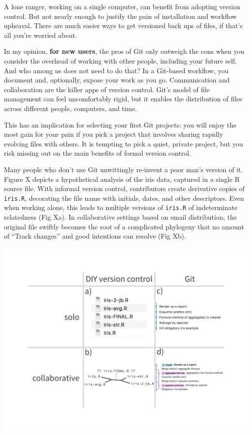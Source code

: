 \documentclass[12pt]{article}
\begin{document}
A lone ranger, working on a single computer, can benefit from adopting
version control. But not nearly enough to justify the pain of
installation and workflow upheaval. There are much easier ways to get
versioned back ups of files, if that's all you're worried about.

In my opinion, \textbf{for new users}, the pros of Git only outweigh the
cons when you consider the overhead of working with other people,
including your future self. And who among us does not need to do that?
In a Git-based workflow, you document and, optionally, expose your work
as you go. Communication and collaboration are the killer apps of
version control. Git's model of file management can feel uncomfortably
rigid, but it enables the distribution of files across different people,
computers, and time.

This has an implication for selecting your first Git projects: you will
enjoy the most gain for your pain if you pick a project that involves
sharing rapidly evolving files with others. It is tempting to pick a
quiet, private project, but you risk missing out on the main benefits of
formal version control.

Many people who don't use Git unwittingly re-invent a poor man's version
of it. Figure X depicts a hypothetical analysis of the iris data,
captured in a single R source file. With informal version control,
contributors create derivative copies of \texttt{iris.R}, decorating the
file name with initials, dates, and other descriptors. Even when working
alone, this leads to multiple versions of \texttt{iris.R} of
indeterminate relatedness (Fig Xa). In collaborative settings based on
email distribution, the original file swiftly becomes the root of a
complicated phylogeny that no amount of ``Track changes'' and good
intentions can resolve (Fig Xb).

\includegraphics[width=1\linewidth]{diy-vs-git-solo-vs-collab}
\end{document}
